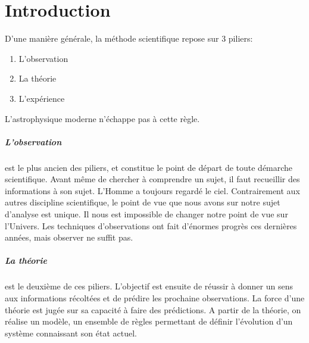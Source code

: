 \chapter{Introduction}

D'une manière générale, la méthode scientifique repose sur 3 piliers: 
\begin{enumerate}
\item L'observation
\item La théorie
\item L'expérience
\end{enumerate}
L'astrophysique moderne n’échappe pas à cette règle.

\paragraph{L'observation} est le plus ancien des piliers, et constitue le point de départ de toute démarche scientifique.
Avant même de chercher à comprendre un sujet, il faut recueillir des informations à son sujet. %
L'Homme a toujours regardé le ciel.
Contrairement aux autres discipline scientifique, le point de vue que nous avons sur notre sujet d'analyse est unique. 
Il nous est impossible de changer notre point de vue sur l'Univers.
Les techniques d'observations ont fait d’énormes progrès ces dernières années, mais observer ne suffit pas.


\paragraph{La théorie} est le deuxième de ces piliers.
L'objectif est ensuite de réussir à donner un sens aux informations récoltées et de prédire les prochaine observations.
La force d'une théorie est jugée sur sa capacité à faire des prédictions.
A partir de la théorie, on réalise un modèle, un ensemble de règles  permettant de définir l'évolution d'un système connaissant son état actuel.

